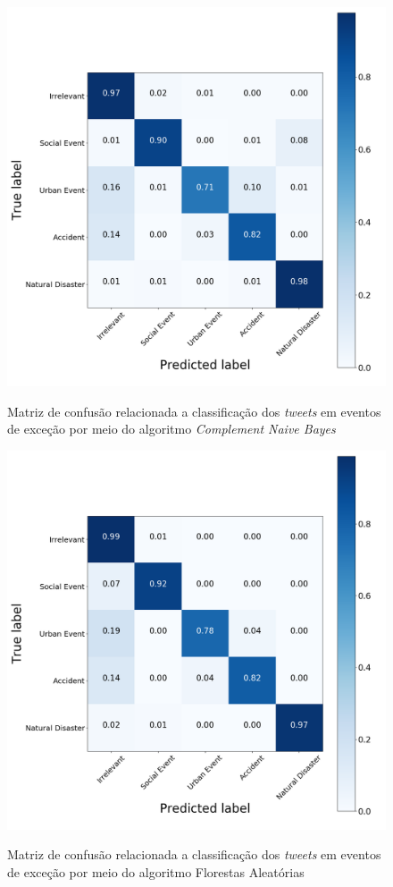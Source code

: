 \documentclass[
	12pt,				%
	oneside,			%
	a4paper,			%
	english,			%
	brazil				%
	]{abntex2ppgsi}
\begin{document}
\begin{apendicesenv}
\begin{figure}[!htb]
	\centering
 	  \caption{Matriz de confusão relacionada a classificação dos \textit{tweets} em eventos de exceção por meio do algoritmo \textit{Complement Naive Bayes}}
		\includegraphics[width=1\linewidth]{images/confusion_matrix_cnb.png}
	\label{fig:confusion_matrix_gnb}
\end{figure}

\begin{figure}[!htb]
	\centering
 	  \caption{Matriz de confusão relacionada a classificação dos \textit{tweets} em eventos de exceção por meio do algoritmo Florestas Aleatórias}
		\includegraphics[width=1\linewidth]{images/confusion_matrix_rf.png}
	\label{fig:confusion_matrix_rf}
\end{figure}


\end{apendicesenv}
\end{document}
